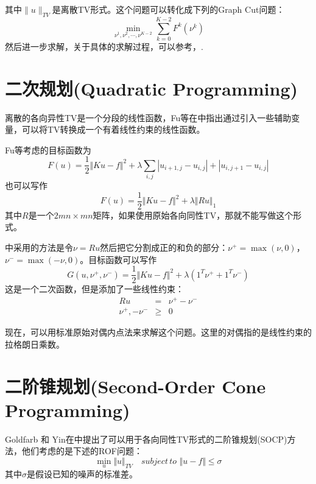 \documentclass[a4paper,12pt]{article}
\begin{document}
其中$\lVert u\rVert_{TV}$是离散TV形式。这个问题可以转化成下列的Graph Cut问题：
\begin{displaymath}
\min_{\nu^1,\nu^2,\cdots,\nu^{K-2}}\sum_{k=0}^{K-2}F^k(\nu^k)
\end{displaymath}
然后进一步求解，关于具体的求解过程，可以参考\cite{Chambolle:1997gr}，\cite{Darbon:2006gr}.

\section{二次规划(Quadratic Programming)}

离散的各向异性TV是一个分段的线性函数，Fu等在\cite{Fu:2006qp}中指出通过引入一些辅助变量，可以将TV转换成一个有着线性约束的线性函数。

Fu等考虑的目标函数为
\begin{displaymath}
F(u)=\frac{1}{2}\Vert Ku-f\Vert^2+\lambda\sum_{i,j}|u_{i+1,j}-u_{i,j}|+|u_{i,j+1}-u_{i,j}|
\end{displaymath}
也可以写作
\begin{displaymath}
F(u)=\frac{1}{2}\Vert Ku-f\Vert^2+\lambda\Vert Ru\Vert_1
\end{displaymath}
其中$R$是一个$2mn\times mn$矩阵，如果使用原始各向同性TV，那就不能写做这个形式。

\cite{Fu:2006qp}中采用的方法是令$\nu=Ru$然后把它分割成正的和负的部分：$\nu^+=\max(\nu,0)$，$\nu^-=\max(-\nu,0)$。目标函数可以写作
\begin{displaymath}
G(u,\nu^+,\nu^-)=\frac{1}{2}\Vert Ku-f\Vert^2+\lambda(1^T\nu^++1^T\nu^-)
\end{displaymath}
这是一个二次函数，但是添加了一些线性约束：
\begin{eqnarray*}
Ru&=&\nu^+-\nu^-\\
\nu^+,-\nu^-&\geq& 0
\end{eqnarray*}

现在，可以用标准原始对偶内点法来求解这个问题。这里的对偶指的是线性约束的拉格朗日乘数。

\section{二阶锥规划(Second-Order Cone Programming)}

Goldfarb 和 Yin在\cite{Goldfarb:2005so}中提出了可以用于各向同性TV形式的二阶锥规划(SOCP)方法，他们考虑的是下述的ROF问题：
\begin{displaymath}
\min_u\Vert u\Vert_{TV}\quad subject\, to\,\,\Vert u-f\Vert\leq \sigma
\end{displaymath}
其中$\sigma$是假设已知的噪声的标准差。
\end{document}
